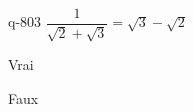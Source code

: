 \begin{truefalse}{q-803}
$\dfrac{1}{\sqrt{2}+\sqrt{3}} = \sqrt{3} - \sqrt{2}$
\item* Vrai
\item Faux
\end{truefalse}

